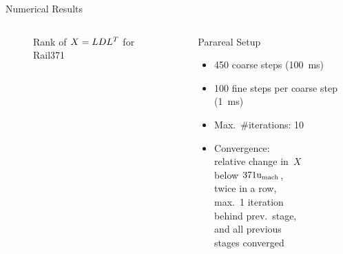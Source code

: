 \begin{frame}{Numerical Results}
\begin{columns}
\begin{minipage}[b][0.75\textwidth][c]{\textwidth}
{\begin{figure}
  \caption{Rank of $X=LDL^T$ for Rail371}
  \end{figure}
}
  \end{minipage}
  \begin{block}{Parareal Setup}
    \begin{itemize}
      \item
        450 coarse steps (\SI{100}{\milli\second})
      \item
        100 fine steps per coarse step (\SI{1}{\milli\second})
      \item
        Max.~\#iterations: 10
      \item
        Convergence:\\
        relative change in~$X$\\ below $371\mathrm u_\text{mach}$,\\
        twice in a row,\\
        max.~1 iteration\\
        behind prev.~stage,\\
        and all previous\\
        stages converged
    \end{itemize}
  \end{block}
  \end{columns}
\end{frame}

